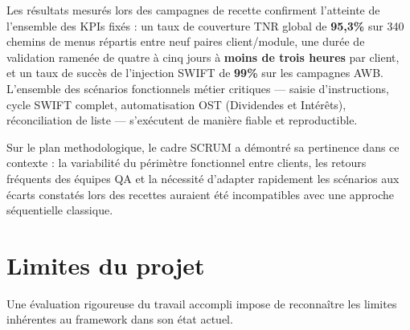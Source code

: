 \documentclass[12pt, a4paper]{report}
\begin{document}
Les résultats mesurés lors des campagnes de recette confirment l'atteinte de l'ensemble des KPIs fixés : un taux de couverture TNR global de \textbf{95,3\%} sur 340 chemins de menus répartis entre neuf paires client/module, une durée de validation ramenée de quatre à cinq jours à \textbf{moins de trois heures} par client, et un taux de succès de l'injection SWIFT de \textbf{99\%} sur les campagnes AWB. L'ensemble des scénarios fonctionnels métier critiques — saisie d'instructions, cycle SWIFT complet, automatisation OST (Dividendes et Intérêts), réconciliation de liste — s'exécutent de manière fiable et reproductible.

Sur le plan methodologique, le cadre SCRUM a démontré sa pertinence dans ce contexte : la variabilité du périmètre fonctionnel entre clients, les retours fréquents des équipes QA et la nécessité d'adapter rapidement les scénarios aux écarts constatés lors des recettes auraient été incompatibles avec une approche séquentielle classique.

\section*{Limites du projet}

Une évaluation rigoureuse du travail accompli impose de reconnaître les limites inhérentes au framework dans son état actuel.
\end{document}
